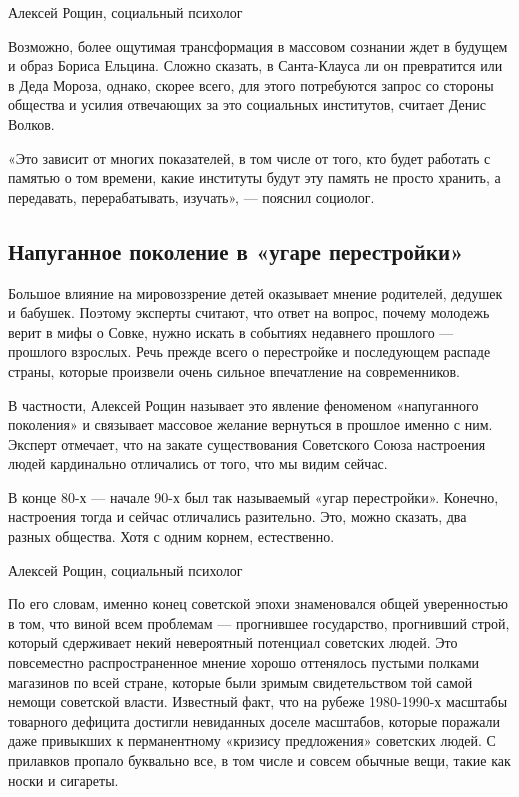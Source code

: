 Алексей Рощин, социальный психолог

Возможно, более ощутимая трансформация в массовом сознании ждет в будущем и
образ Бориса Ельцина. Сложно сказать, в Санта-Клауса ли он превратится или в
Деда Мороза, однако, скорее всего, для этого потребуются запрос со стороны
общества и усилия отвечающих за это социальных институтов, считает Денис
Волков.

«Это зависит от многих показателей, в том числе от того, кто будет работать с
памятью о том времени, какие институты будут эту память не просто хранить, а
передавать, перерабатывать, изучать», — пояснил социолог.

\subsection{Напуганное поколение в «угаре перестройки»}

Большое влияние на мировоззрение детей оказывает мнение родителей, дедушек и
бабушек. Поэтому эксперты считают, что ответ на вопрос, почему молодежь верит в
мифы о Совке, нужно искать в событиях недавнего прошлого — прошлого взрослых.
Речь прежде всего о перестройке и последующем распаде страны, которые произвели
очень сильное впечатление на современников.

В частности, Алексей Рощин называет это явление феноменом «напуганного
поколения» и связывает массовое желание вернуться в прошлое именно с ним.
Эксперт отмечает, что на закате существования Советского Союза настроения людей
кардинально отличались от того, что мы видим сейчас.

В конце 80-х — начале 90-х был так называемый «угар перестройки». Конечно,
настроения тогда и сейчас отличались разительно. Это, можно сказать, два разных
общества. Хотя с одним корнем, естественно.

Алексей Рощин, социальный психолог

По его словам, именно конец советской эпохи знаменовался общей уверенностью в
том, что виной всем проблемам — прогнившее государство, прогнивший строй,
который сдерживает некий невероятный потенциал советских людей. Это повсеместно
распространенное мнение хорошо оттенялось пустыми полками магазинов по всей
стране, которые были зримым свидетельством той самой немощи советской власти.
Известный факт, что на рубеже 1980-1990-х масштабы товарного дефицита достигли
невиданных доселе масштабов, которые поражали даже привыкших к перманентному
«кризису предложения» советских людей. С прилавков пропало буквально все, в том
числе и совсем обычные вещи, такие как носки и сигареты.

